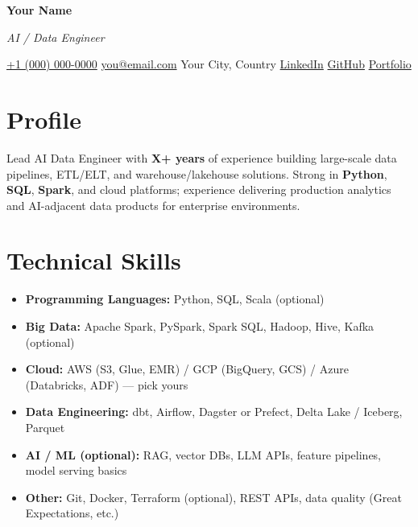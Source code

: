 \documentclass[10pt,letterpaper]{article}
\begin{document}
{\LARGE\textbf{Your Name}}

{\small\textit{AI / Data Engineer}}

\vspace{0.25em}
{\small
\href{tel:+10000000000}{+1 (000) 000-0000}
\;\textbar\;
\href{mailto:you@email.com}{you@email.com}
\;\textbar\;
Your City, Country
\;\textbar\;
\href{https://linkedin.com/in/yourprofile}{LinkedIn}
\;\textbar\;
\href{https://github.com/yourusername}{GitHub}
\;\textbar\;
\href{https://yourportfolio.dev}{Portfolio}
}

\section*{Profile}
Lead AI Data Engineer with \textbf{X+ years} of experience building large-scale data pipelines, ETL/ELT, and warehouse/lakehouse solutions. Strong in \textbf{Python}, \textbf{SQL}, \textbf{Spark}, and cloud platforms; experience delivering production analytics and AI-adjacent data products for enterprise environments.

\section*{Technical Skills}
{\small
\begin{itemize}[leftmargin=0pt, itemindent=0pt, label={}, noitemsep, topsep=0pt]
  \item \textbf{Programming Languages:} Python, SQL, Scala (optional)
  \item \textbf{Big Data:} Apache Spark, PySpark, Spark SQL, Hadoop, Hive, Kafka (optional)
  \item \textbf{Cloud:} AWS (S3, Glue, EMR) / GCP (BigQuery, GCS) / Azure (Databricks, ADF) — pick yours
  \item \textbf{Data Engineering:} dbt, Airflow, Dagster or Prefect, Delta Lake / Iceberg, Parquet
  \item \textbf{AI / ML (optional):} RAG, vector DBs, LLM APIs, feature pipelines, model serving basics
  \item \textbf{Other:} Git, Docker, Terraform (optional), REST APIs, data quality (Great Expectations, etc.)
\end{itemize}
}
\end{document}
